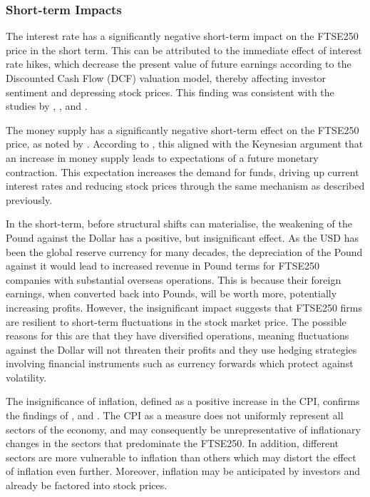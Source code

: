 \documentclass[11pt,a4paper]{article}
\newcommand{\citeboth}[1]{\citeauthor{#1} \citep{#1}}
\begin{document}
\subsubsection{Short-term Impacts}

The interest rate has a significantly
negative short-term impact on the FTSE250 price in the short term. 
This can be attributed to the immediate effect of interest rate hikes, 
which decrease the present value of future earnings according to the 
Discounted Cash Flow (DCF) valuation model, thereby 
affecting investor sentiment and depressing stock prices. 
This finding was consistent with the studies by 
\citeboth{alam2009}, \citeboth{demir2019}, and \citeboth{neifar2023}.

The money supply has a significantly negative short-term effect on the 
FTSE250 price, as noted by \citeboth{olawale2014}. 
According to \citeboth{sellin2001}, this aligned with the Keynesian argument 
that an increase in money supply leads to expectations of a future 
monetary contraction. This expectation increases the demand for 
funds, driving up current interest rates and reducing stock prices 
through the same mechanism as described previously.

In the short-term, before structural shifts can materialise, the
weakening of the Pound against the Dollar has a positive, but 
insignificant effect. As the USD has been 
the global reserve currency for many decades, the depreciation of the Pound 
against it would lead to increased revenue in Pound terms for FTSE250 
companies with substantial overseas operations. 
This is because their foreign earnings, 
when converted back into Pounds, will be worth more, 
potentially increasing profits. However, the insignificant impact suggests 
that FTSE250 firms are resilient to short-term fluctuations in the stock market 
price. The possible reasons for this are that they have diversified 
operations, meaning fluctuations against the Dollar will not threaten 
their profits and they use hedging strategies involving financial instruments 
such as currency forwards which protect against volatility. 

The insignificance of inflation, defined as a positive 
increase in the CPI, confirms the findings of 
\citeboth{gultekin1983}, \citeboth{firth1979} and \citeboth{neifar2023}. 
The CPI as a measure does not uniformly represent all sectors of the economy, 
and may consequently be unrepresentative of inflationary changes in the 
sectors that predominate the FTSE250. In addition, different sectors 
are more vulnerable to inflation than others which may distort the effect 
of inflation even further. Moreover, inflation may be anticipated 
by investors and already be factored into stock prices.
\end{document}
